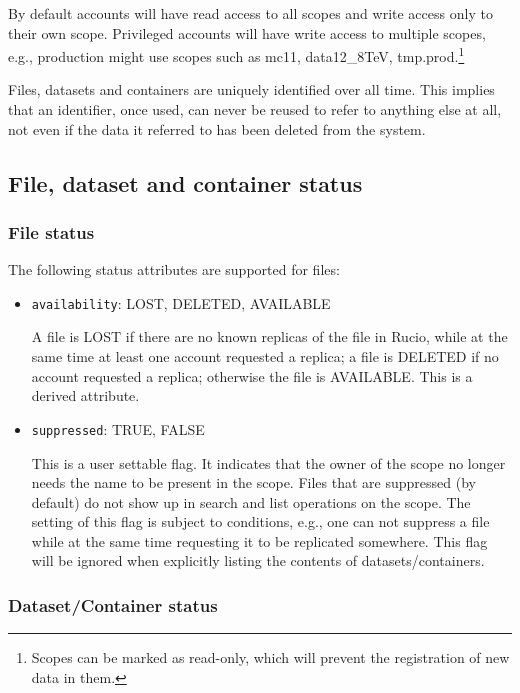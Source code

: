 \documentclass{atlasnote}
\begin{document}
By default accounts will have read access to all scopes and write access only to their own scope. Privileged accounts will have write access to multiple scopes, e.g., production might use scopes such as mc11, data12\_8TeV, tmp.prod.\footnote{Scopes can be marked as read-only, which will prevent the registration of new data in them.}

Files, datasets and containers are uniquely identified over all time. This implies that an identifier, once used, can never be reused to refer to anything else at all, not even if the data it referred to has been deleted from the system.

\subsection{File, dataset and container status}

\subsubsection{File status}
\label{sec:file-status}

The following status attributes are supported for files:

\begin{itemize}
\item{} \texttt{availability}: LOST, DELETED, AVAILABLE

A file is LOST if there are no known replicas of the file in Rucio, while at the same time at least one account requested a replica; a file is DELETED if no account requested a replica; otherwise the file is AVAILABLE. This is a derived attribute.

\item{} \texttt{suppressed}: TRUE, FALSE

This is a user settable flag. It indicates that the owner of the scope no longer needs the name to be present in the scope. Files that are suppressed (by default) do not show up in search and list operations on the scope. The setting of this flag is subject to conditions, e.g., one can not suppress a file while at the same time requesting it to be replicated somewhere. This flag will be ignored when explicitly listing the contents of datasets/containers.
\end{itemize}

\subsubsection{Dataset/Container status}
\label{sec:dataset-container-status}
\end{document}
